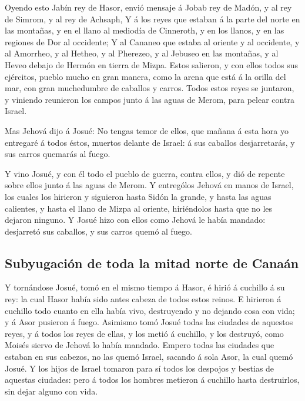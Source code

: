 Oyendo esto Jabín rey de Hasor, envió mensaje á Jobab rey
de Madón, y al rey de Simrom, y al rey de Achsaph,  Y á
los reyes que estaban á la parte del norte en las montañas, y en el
llano al mediodía de Cinneroth, y en los llanos, y en las regiones de
Dor al occidente;  Y al Cananeo que estaba al oriente y al
occidente, y al Amorrheo, y al Hetheo, y al Pherezeo, y al Jebuseo en
las montañas, y al Heveo debajo de Hermón en tierra de Mizpa.
 Estos salieron, y con ellos todos sus ejércitos, pueblo
mucho en gran manera, como la arena que está á la orilla del mar, con
gran muchedumbre de caballos y carros.  Todos estos reyes
se juntaron, y viniendo reunieron los campos junto á las aguas de Merom,
para pelear contra Israel.

 Mas Jehová dijo á Josué: No tengas temor de ellos, que
mañana á esta hora yo entregaré á todos éstos, muertos delante de
Israel: á sus caballos desjarretarás, y sus carros quemarás al fuego.

 Y vino Josué, y con él todo el pueblo de guerra, contra
ellos, y dió de repente sobre ellos junto á las aguas de Merom.
 Y entrególos Jehová en manos de Israel, los cuales los
hirieron y siguieron hasta Sidón la grande, y hasta las aguas calientes,
y hasta el llano de Mizpa al oriente, hiriéndolos hasta que no les
dejaron ninguno.  Y Josué hizo con ellos como Jehová le
había mandado: desjarretó sus caballos, y sus carros quemó al fuego.

\hypertarget{subyugaciuxf3n-de-toda-la-mitad-norte-de-canauxe1n}{%
\subsection{Subyugación de toda la mitad norte de
Canaán}\label{subyugaciuxf3n-de-toda-la-mitad-norte-de-canauxe1n}}

 Y tornándose Josué, tomó en el mismo tiempo á Hasor, é
hirió á cuchillo á su rey: la cual Hasor había sido antes cabeza de
todos estos reinos.  E hirieron á cuchillo todo cuanto en
ella había vivo, destruyendo y no dejando cosa con vida; y á Asor
pusieron á fuego.  Asimismo tomó Josué todas las ciudades
de aquestos reyes, y á todos los reyes de ellas, y los metió á cuchillo,
y los destruyó, como Moisés siervo de Jehová lo había mandado.
 Empero todas las ciudades que estaban en sus cabezos, no
las quemó Israel, sacando á sola Asor, la cual quemó Josué.
 Y los hijos de Israel tomaron para sí todos los despojos
y bestias de aquestas ciudades: pero á todos los hombres metieron á
cuchillo hasta destruirlos, sin dejar alguno con vida.

